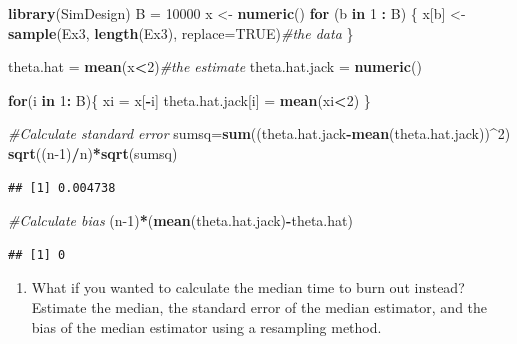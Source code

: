 \documentclass[
]{article}
\newenvironment{Shaded}{\begin{snugshade}}{\end{snugshade}}
\newcommand{\CommentTok}[1]{\textcolor[rgb]{0.56,0.35,0.01}{\textit{#1}}}
\newcommand{\ControlFlowTok}[1]{\textcolor[rgb]{0.13,0.29,0.53}{\textbf{#1}}}
\newcommand{\DataTypeTok}[1]{\textcolor[rgb]{0.13,0.29,0.53}{#1}}
\newcommand{\DecValTok}[1]{\textcolor[rgb]{0.00,0.00,0.81}{#1}}
\newcommand{\KeywordTok}[1]{\textcolor[rgb]{0.13,0.29,0.53}{\textbf{#1}}}
\newcommand{\NormalTok}[1]{#1}
\newcommand{\OperatorTok}[1]{\textcolor[rgb]{0.81,0.36,0.00}{\textbf{#1}}}
\newcommand{\OtherTok}[1]{\textcolor[rgb]{0.56,0.35,0.01}{#1}}
\newcommand{\StringTok}[1]{\textcolor[rgb]{0.31,0.60,0.02}{#1}}
\providecommand{\tightlist}{%
  \setlength{\itemsep}{0pt}\setlength{\parskip}{0pt}}
\begin{document}
\begin{Shaded}
\begin{Highlighting}[]
\KeywordTok{library}\NormalTok{(SimDesign)}
\NormalTok{B =}\StringTok{ }\DecValTok{10000}
\NormalTok{x <-}\StringTok{ }\KeywordTok{numeric}\NormalTok{()}
\ControlFlowTok{for}\NormalTok{ (b }\ControlFlowTok{in} \DecValTok{1} \OperatorTok{:}\StringTok{ }\NormalTok{B) \{}
\NormalTok{  x[b] <-}\StringTok{ }\KeywordTok{sample}\NormalTok{(Ex3, }\KeywordTok{length}\NormalTok{(Ex3), }\DataTypeTok{replace=}\OtherTok{TRUE}\NormalTok{)}\CommentTok{#the data}
\NormalTok{\}}

\NormalTok{theta.hat =}\StringTok{ }\KeywordTok{mean}\NormalTok{(x}\OperatorTok{<}\DecValTok{2}\NormalTok{)}\CommentTok{#the estimate}
\NormalTok{theta.hat.jack =}\StringTok{ }\KeywordTok{numeric}\NormalTok{()}

\ControlFlowTok{for}\NormalTok{(i }\ControlFlowTok{in} \DecValTok{1}\OperatorTok{:}\StringTok{ }\NormalTok{B)\{}
\NormalTok{  xi =}\StringTok{ }\NormalTok{x[}\OperatorTok{-}\NormalTok{i]}
\NormalTok{  theta.hat.jack[i] =}\StringTok{ }\KeywordTok{mean}\NormalTok{(xi}\OperatorTok{<}\DecValTok{2}\NormalTok{)}
\NormalTok{\}}

\CommentTok{#Calculate standard error}
\NormalTok{sumsq=}\KeywordTok{sum}\NormalTok{((theta.hat.jack}\OperatorTok{-}\KeywordTok{mean}\NormalTok{(theta.hat.jack))}\OperatorTok{^}\DecValTok{2}\NormalTok{)}
\KeywordTok{sqrt}\NormalTok{((n}\DecValTok{-1}\NormalTok{)}\OperatorTok{/}\NormalTok{n)}\OperatorTok{*}\KeywordTok{sqrt}\NormalTok{(sumsq)}
\end{Highlighting}
\end{Shaded}

\begin{verbatim}
## [1] 0.004738
\end{verbatim}

\begin{Shaded}
\begin{Highlighting}[]
\CommentTok{#Calculate bias}
\NormalTok{(n}\DecValTok{-1}\NormalTok{)}\OperatorTok{*}\NormalTok{(}\KeywordTok{mean}\NormalTok{(theta.hat.jack)}\OperatorTok{-}\NormalTok{theta.hat)}
\end{Highlighting}
\end{Shaded}

\begin{verbatim}
## [1] 0
\end{verbatim}

\begin{enumerate}
\def\labelenumi{\arabic{enumi}.}
\setcounter{enumi}{3}
\tightlist
\item
  What if you wanted to calculate the median time to burn out instead?
  Estimate the median, the standard error of the median estimator, and
  the bias of the median estimator using a resampling method.
\end{enumerate}
\end{document}
